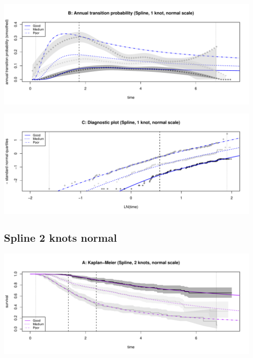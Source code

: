\documentclass[
]{article}
\begin{document}
\begin{flushleft}\includegraphics[height=0.25\textheight]{Images/spline_norm1-2} \end{flushleft}

\begin{flushleft}\includegraphics[height=0.25\textheight]{Images/spline_norm1-3} \end{flushleft}

\clearpage

\hypertarget{spline-2-knots-normal}{%
\subsection{Spline 2 knots normal}\label{spline-2-knots-normal}}

\begin{flushleft}\includegraphics[height=0.25\textheight]{Images/spline_norm2-1} \end{flushleft}
\end{document}
